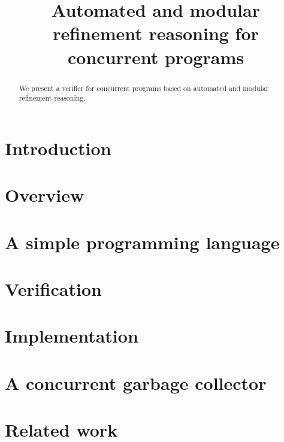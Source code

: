 \documentclass [preprint]{sigplanconf}
\theoremstyle{remark}
\theoremstyle{definition}
\newcommand{\civl}{{\sc civl}\xspace}
\newcommand{\boogie}{{\sc boogie}\xspace}
\newcommand{\zthree}{{\sc Z3}\xspace}
\newcommand{\casm}{{\sc casm}\xspace}
\begin{document}
\setlength{\pdfpageheight}{\paperheight}
\setlength{\pdfpagewidth}{\paperwidth}


\title{Automated and modular refinement reasoning for concurrent programs}
\authorinfo{}{}{}

\maketitle



\begin{abstract}
We present a verifier for concurrent programs based on automated and modular refinement reasoning.  
\end{abstract}

\section{Introduction}
\label{sec:introduction}
% 
\section{Overview}
\label{sec:overview}

\section{A simple programming language}
\label{sec:language}

\section{Verification}
\label{sec:verification}

\section{Implementation}
\label{sec:implementation}
\section{A concurrent garbage collector}
\label{sec:GC}
\section{Related work}
\label{sec:related}
% 


%
\end{document}
